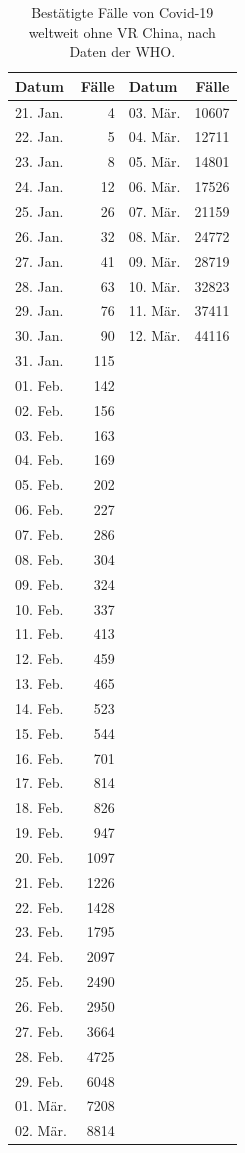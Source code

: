 \documentclass[a4paper,11pt,fleqn,twocolumn,twoside,dvipdfmx]{scrartcl}
\numberwithin{equation}{section}
\newcommand{\strong}[1]{\textbf{#1}}
\begin{document}
\vspace{-6mm}
\begin{table}[h]
\caption{Bestätigte Fälle von Covid-19\newline
weltweit ohne VR China,\newline
nach Daten der WHO.}
\begin{tabular}{l@{\;\;}r@{\qquad}l@{\;\;}r}
\toprule
\strong{Datum} & \strong{Fälle} & \strong{Datum} & \strong{Fälle}\\
\midrule
21. Jan. & 4 & 03. Mär. & 10607\\
22. Jan. & 5 & 04. Mär. & 12711\\
23. Jan. & 8 & 05. Mär. & 14801\\
24. Jan. & 12 & 06. Mär. & 17526\\
25. Jan. & 26 & 07. Mär. & 21159\\
26. Jan. & 32 & 08. Mär. & 24772\\
27. Jan. & 41 & 09. Mär. & 28719\\
28. Jan. & 63 & 10. Mär. & 32823\\
29. Jan. & 76 & 11. Mär. & 37411\\
30. Jan. & 90 & 12. Mär. & 44116\\
31. Jan. & 115\\
01. Feb. & 142\\
02. Feb. & 156\\
03. Feb. & 163\\
04. Feb. & 169\\
05. Feb. & 202\\
06. Feb. & 227\\
07. Feb. & 286\\
08. Feb. & 304\\
09. Feb. & 324\\
10. Feb. & 337\\
11. Feb. & 413\\
12. Feb. & 459\\
13. Feb. & 465\\
14. Feb. & 523\\
15. Feb. & 544\\
16. Feb. & 701\\
17. Feb. & 814\\
18. Feb. & 826\\
19. Feb. & 947\\
20. Feb. & 1097\\
21. Feb. & 1226\\
22. Feb. & 1428\\
23. Feb. & 1795\\
24. Feb. & 2097\\
25. Feb. & 2490\\
26. Feb. & 2950\\
27. Feb. & 3664\\
28. Feb. & 4725\\
29. Feb. & 6048\\
01. Mär. & 7208\\
02. Mär. & 8814\\
\bottomrule
\end{tabular}
\vspace{-12em}
\end{table}
\end{document}

